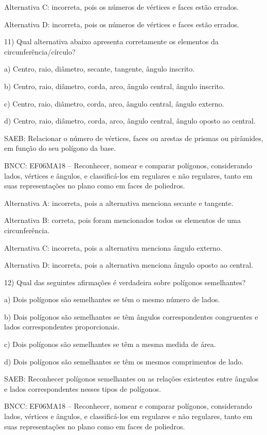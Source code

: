 Alternativa C: incorreta, pois os números de vértices e faces estão
errados.

Alternativa D: incorreta, pois os números de vértices e faces estão
errados.

11) Qual alternativa abaixo apresenta corretamente os elementos da
circunferência/círculo?

a) Centro, raio, diâmetro, secante, tangente, ângulo inscrito.

b) Centro, raio, diâmetro, corda, arco, ângulo central, ângulo inscrito.

c) Centro, raio, diâmetro, corda, arco, ângulo central, ângulo externo.

d) Centro, raio, diâmetro, corda, arco, ângulo central, ângulo oposto ao
central.

SAEB: Relacionar o número de vértices, faces ou arestas de prismas ou
pirâmides, em função do seu polígono da base.

BNCC: EF06MA18 -- Reconhecer, nomear e comparar polígonos, considerando
lados, vértices e ângulos, e classificá-los em regulares e não
regulares, tanto em suas representações no plano como em faces de
poliedros.

Alternativa A: incorreta, pois a alternativa menciona secante e
tangente.

Alternativa B: correta, pois foram mencionados todos os elementos de uma
circunferência.

Alternativa C: incorreta, pois a alternativa menciona ângulo externo.

Alternativa D: incorreta, pois a alternativa menciona ângulo oposto ao
central.

12) Qual das seguintes afirmações é verdadeira sobre polígonos
semelhantes?

a) Dois polígonos são semelhantes se têm o mesmo número de lados.

b) Dois polígonos são semelhantes se têm ângulos correspondentes
congruentes e lados correspondentes proporcionais.

c) Dois polígonos são semelhantes se têm a mesma medida de área.

d) Dois polígonos são semelhantes se têm os mesmos comprimentos de lado.

SAEB: Reconhecer polígonos semelhantes ou as relações existentes entre
ângulos e lados correspondentes nesses tipos de polígonos.

BNCC: EF06MA18 -- Reconhecer, nomear e comparar polígonos, considerando
lados, vértices e ângulos, e classificá-los em regulares e não
regulares, tanto em suas representações no plano como em faces de
poliedros.

